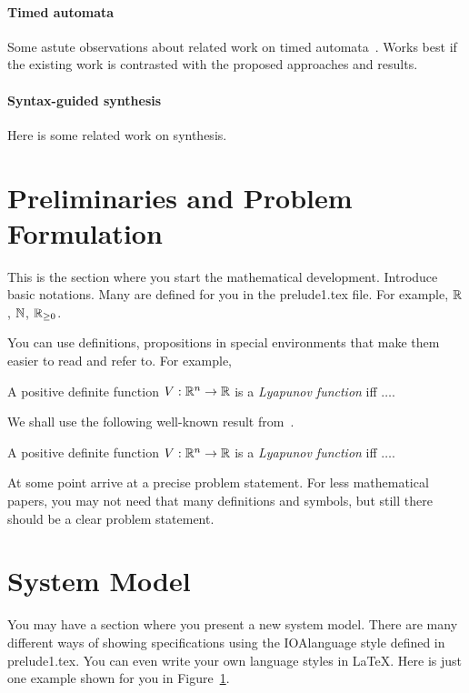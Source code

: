 \documentclass[11pt]{article}
\begin{document}
\paragraph{Timed automata} Some astute observations about related work on timed automata~\cite{alur:tcs}. Works best if the existing work is contrasted with the proposed approaches and results.

\paragraph{Syntax-guided synthesis} Here is some related work on synthesis. 


\section{Preliminaries and Problem Formulation}
\label{sec:prelims}
This is the section where you start the mathematical development. Introduce basic notations. Many are defined for you in the {\sf prelude1.tex} file. For example, $\reals$, $\naturals$, $\nnreals$. 

You can use definitions, propositions in special  environments that make them easier to read and refer to. For example,

\begin{definition}
A positive definite function $V:\reals^n \rightarrow \reals$ is a {\em Lyapunov function} iff $\ldots$.
\end{definition}

We shall use the following well-known result from~\cite{alur:tcs}.
\begin{theorem}
	A positive definite function $V:\reals^n \rightarrow \reals$ is a {\em Lyapunov function} iff $\ldots$.
\end{theorem}

At some point arrive at a  precise problem statement. For less mathematical papers, you may not need that many definitions and symbols, but still there should be a clear problem statement.

\begin{figure}[!ht]
	\label{fig:rimlesswheel}
	\centering
\end{figure}

\section{System Model}
\label{sec:system}
You may have a section where you present a new system model. There are many different ways of showing specifications using the IOAlanguage style defined in {\sf prelude1.tex}. You can even write your own language styles in \LaTeX. Here is just one example shown for you in Figure~\ref{fig:rimlesswheel}.
\end{document}
